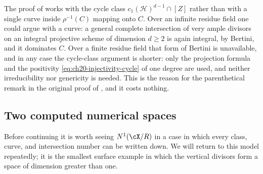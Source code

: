 \begin{remark}
\label{rem:ch20-cycle-not-curve}
The proof of  works with the cycle class
\(c_1(\mathcal H)^{d-1}\cap[Z]\) rather than with a single curve inside
\(\rho^{-1}(C)\) mapping onto \(C\).  Over an infinite residue field one
could argue with a curve: a general complete intersection of very ample
divisors on an integral projective scheme of dimension \(d\geq2\) is again
integral, by Bertini, and it dominates \(C\).  Over a finite residue field
that form of Bertini is unavailable, and in any case the cycle-class
argument is shorter: only the projection formula and the positivity
\eqref{eq:ch20-injectivity-cycle} of one degree are used, and neither
irreducibility nor genericity is needed.  This is the reason for the
parenthetical remark in the original proof of
, and it costs nothing.
\end{remark}

\subsection{Two computed numerical spaces}
\label{sec:ch20-n1-examples}

Before continuing it is worth seeing \(N^1(\cX/R)\) in a case in which every
class, curve, and intersection number can be written down.  We will return
to this model repeatedly; it is the smallest surface example in which the
vertical divisors form a space of dimension greater than one.

